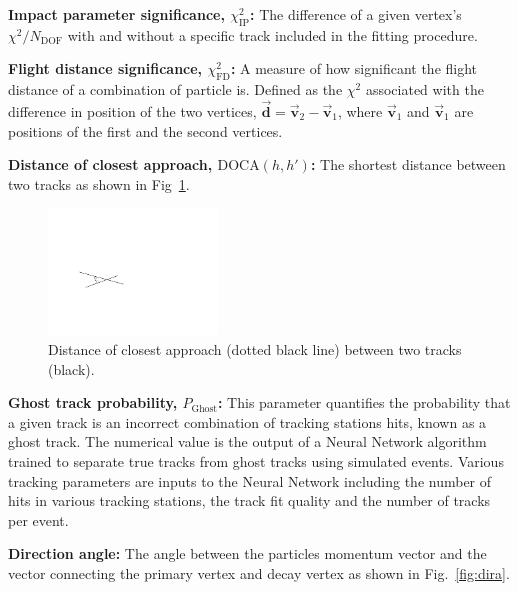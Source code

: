 \begin{description}
\item \textbf{Impact parameter significance, $\chi^{2}_{\text{IP}}$:} The difference of a given vertex's $\chi^{2}/N_{\text{DOF}}$ with and without a specific track included in the fitting procedure.
\item \textbf{Flight distance significance, $\chi^{2}_{\text{FD}}$:} A measure of how significant the flight distance of a combination of particle is. Defined as the $\chi^{2}$ associated with the difference in position of the two vertices, $\vec{\mathbf{d}} = \vec{\mathbf{v}}_2 - \vec{\mathbf{v}}_1$, where $\vec{\mathbf{v}}_1$ and $\vec{\mathbf{v}}_1$ are positions of the first and the second vertices. 
\item \textbf{Distance of closest approach, $\text{DOCA}(h,h')$:} The shortest distance between two tracks as shown in Fig~\ref{fig:doca}.
\begin{figure}[!h]
    \centering
    \includegraphics[width=0.4\textwidth]{figs/Selection/DOCA.pdf}
    \caption{Distance of closest approach (dotted black line) between two tracks (black).}
    \label{fig:doca}   
\end{figure}


\item \textbf{Ghost track probability, $P_{\text{Ghost}}$:} This parameter quantifies the probability that a given track is an incorrect combination of tracking stations hits, known as a ghost track. The numerical value is the output of a Neural Network algorithm trained to separate true tracks from ghost tracks using simulated events. Various tracking parameters are inputs to the Neural Network including the number of hits in various tracking stations, the track fit quality and the number of tracks per event. 

\item \textbf{Direction angle:} The angle between the particles momentum vector and the vector connecting the primary vertex and decay vertex as shown in Fig.~\ref{fig:dira}.


\end{description}
